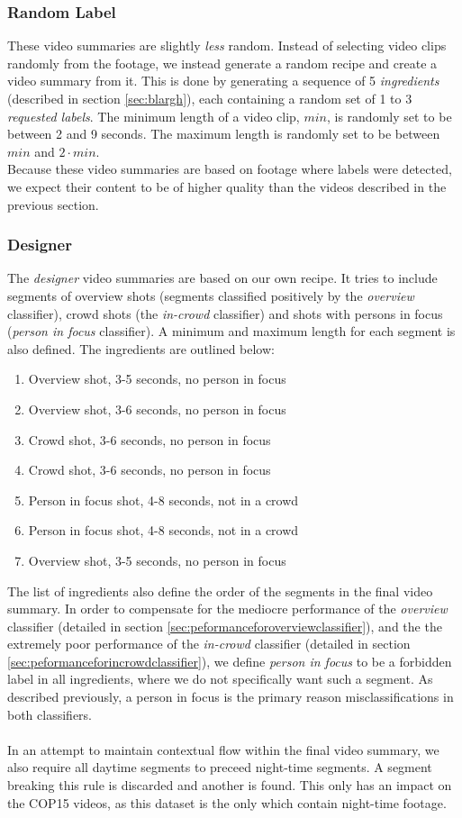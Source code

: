 \subsubsection{Random Label}
%
These video summaries are slightly \textit{less} random. Instead of selecting video clips randomly from the footage, we instead generate a random recipe and create a video summary from it. This is done by generating a sequence of 5 \textit{ingredients} (described in section \ref{sec:blargh}), each containing a random set of 1 to 3 \textit{requested labels}. The minimum length of a video clip, $min$, is randomly set to be between 2 and 9 seconds. The maximum length is randomly set to be between $min$ and $2 \cdot min$.\\
Because these video summaries are based on footage where labels were detected, we expect their content to be of higher quality than the videos described in the previous section.
%
\subsubsection{Designer}\label{sec:phase4designer}
%
The \textit{designer} video summaries are based on our own recipe. It tries to include segments of overview shots (segments classified positively by the \textit{overview} classifier), crowd shots (the \textit{in-crowd} classifier) and shots with persons in focus (\textit{person in focus} classifier). A minimum and maximum length for each segment is also defined. The ingredients are outlined below:
%
\begin{enumerate}
\item Overview shot, 3-5 seconds, no person in focus
\item Overview shot, 3-6 seconds, no person in focus
\item Crowd shot, 3-6 seconds, no person in focus
\item Crowd shot, 3-6 seconds, no person in focus
\item Person in focus shot, 4-8 seconds, not in a crowd
\item Person in focus shot, 4-8 seconds, not in a crowd
\item Overview shot, 3-5 seconds, no person in focus
\end{enumerate}
%
The list of ingredients also define the order of the segments in the final video summary. In order to compensate for the mediocre performance of the \textit{overview} classifier (detailed in section \ref{sec:peformanceforoverviewclassifier}), and the the extremely poor performance of the \textit{in-crowd} classifier (detailed in section \ref{sec:peformanceforincrowdclassifier}), we define \textit{person in focus} to be a forbidden label in all ingredients, where we do not specifically want such a segment. As described previously, a person in focus is the primary reason misclassifications in both classifiers.\\
\\
In an attempt to maintain contextual flow within the final video summary, we also require all daytime segments to preceed night-time segments. A segment breaking this rule is discarded and another is found. This only has an impact on the COP15 videos, as this dataset is the only which contain night-time footage.
%
